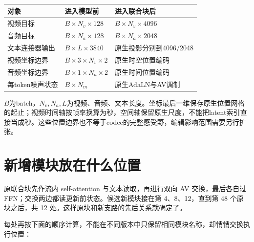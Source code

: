 {\def\LTcaptype{table} %
\small\setlength{\tabcolsep}{3pt}\renewcommand{\arraystretch}{1.18}
\begin{longtable}[]{@{}
  >{\raggedright\arraybackslash}p{}
  >{\raggedright\arraybackslash}p{}
  >{\raggedright\arraybackslash}p{}@{}}
\toprule\noalign{}
\begin{minipage}[b]{\linewidth}\raggedright
对象
\end{minipage} & \begin{minipage}[b]{\linewidth}\raggedright
进入模型前
\end{minipage} & \begin{minipage}[b]{\linewidth}\raggedright
进入联合块后
\end{minipage} \\
\midrule\noalign{}
\endhead
\bottomrule\noalign{}
\endlastfoot
视频目标 & \(B\times N_v\times128\) & \(B\times N_v\times4096\) \\
音频目标 & \(B\times N_a\times128\) & \(B\times N_a\times2048\) \\
文本连接器输出 & \(B\times L\times3840\) & 原生投影分别到4096/2048 \\
视频坐标边界 & \(B\times3\times N_v\times2\) & 原生时空位置编码 \\
音频坐标边界 & \(B\times1\times N_a\times2\) & 原生时间位置编码 \\
每token噪声状态 & \(B\times N_m\) & 原生AdaLN与AV调制 \\
\end{longtable}
}

\(B\)为batch，\(N_v,N_a,L\)为视频、音频、文本长度。坐标最后一维保存原生位置网格的起止；视频时间轴按帧率换算为秒，空间轴保留原生尺度，不能把latent索引直接当成秒。这些位置边界也不等于codec的完整感受野，编辑影响范围需要另行扩张。

\section{新增模块放在什么位置}\label{seedance-m21-ux65b0ux589eux6a21ux5757ux653eux5728ux4ec0ux4e48ux4f4dux7f6e}

原联合块先作流内 self-attention 与文本读取，再进行双向 AV 交换，最后各自过 FFN；交换两边都读更新前状态。候选新模块接在第 4、8、12，直到第 48 个原块之后，共 12 处。这样原块和新支路的先后关系就确定了。

每处再按下面的顺序计算，不能在不同版本中只保留相同模块名称，却悄悄交换执行位置：

